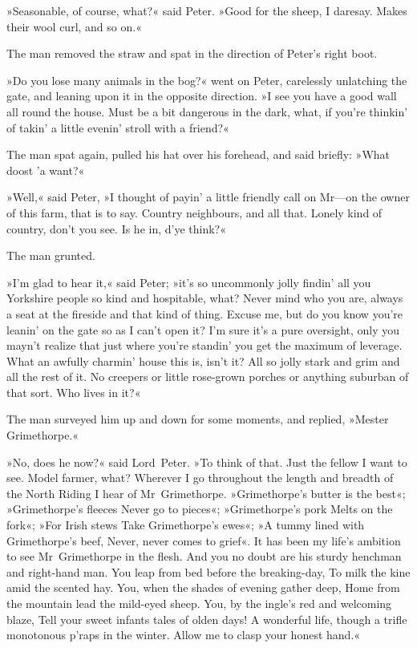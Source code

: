 »Seasonable, of course, what?« said Peter. »Good for the sheep, I daresay. Makes their wool curl, and so on.«

The man removed the straw and spat in the direction of Peter's right boot.

»Do you lose many animals in the bog?« went on Peter, carelessly unlatching the gate, and leaning upon it in the opposite direction. »I see you have a good wall all round the house. Must be a bit dangerous in the dark, what, if you're thinkin' of takin' a little evenin' stroll with a friend?«

The man spat again, pulled his hat over his forehead, and said briefly:
»What doost 'a want?«

»Well,« said Peter, »I thought of payin' a little friendly call on Mr—on the owner of this farm, that is to say. Country neighbours, and all that. Lonely kind of country, don't you see. Is he in, d'ye think?«

The man grunted.

»I'm glad to hear it,« said Peter; »it's so uncommonly jolly findin' all you Yorkshire people so kind and hospitable, what? Never mind who you are, always a seat at the fireside and that kind of thing. Excuse me, but do you know you're leanin' on the gate so as I can't open it?  I'm sure it's a pure oversight, only you mayn't realize that just where you're standin' you get the maximum of leverage. What an awfully charmin' house this is, isn't it? All so jolly stark and grim and all the rest of it. No creepers or little rose-grown porches or anything suburban of that sort. Who lives in it?«

The man surveyed him up and down for some moments, and replied, »Mester Grimethorpe.«

»No, does he now?« said Lord~Peter. »To think of that. Just the fellow I want to see. Model farmer, what? Wherever I go throughout the length and breadth of the North Riding I hear of Mr~Grimethorpe.  »Grimethorpe's butter is the best«; »Grimethorpe's fleeces Never go to pieces«; »Grimethorpe's pork Melts on the fork«; »For Irish stews Take Grimethorpe's ewes«; »A tummy lined with Grimethorpe's beef, Never, never comes to grief«. It has been my life's ambition to see Mr~Grimethorpe in the flesh. And you no doubt are his sturdy henchman and right-hand man. You leap from bed before the breaking-day, To milk the kine amid the scented hay. You, when the shades of evening gather deep, Home from the mountain lead the mild-eyed sheep. You, by the ingle's red and welcoming blaze, Tell your sweet infants tales of olden days! A wonderful life, though a trifle monotonous p'raps in the winter. Allow me to clasp your honest hand.«

